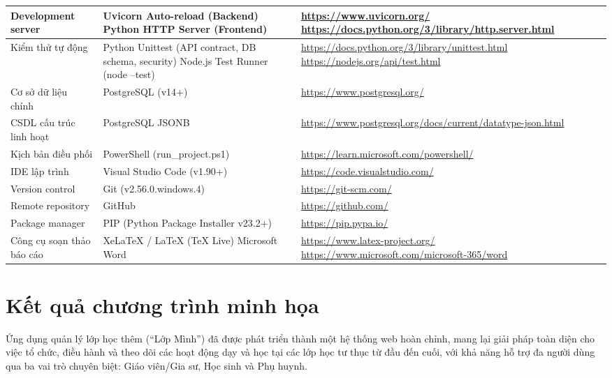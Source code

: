 \documentclass[12pt,a4paper]{report}
\begin{document}
\begin{longtable}{|>{\raggedright\arraybackslash}p{3.8cm}|>{\raggedright\arraybackslash}p{5.4cm}|>{\raggedright\arraybackslash}p{6.4cm}|}
    Development server & Uvicorn Auto-reload (Backend) \newline Python HTTP Server (Frontend) & \url{https://www.uvicorn.org/} \newline \url{https://docs.python.org/3/library/http.server.html} \\ \hline
    Kiểm thử tự động & Python Unittest (API contract, DB schema, security) \newline Node.js Test Runner (node --test) & \url{https://docs.python.org/3/library/unittest.html} \newline \url{https://nodejs.org/api/test.html} \\ \hline
    Cơ sở dữ liệu chính & PostgreSQL (v14+) & \url{https://www.postgresql.org/} \\ \hline
    CSDL cấu trúc linh hoạt & PostgreSQL JSONB & \url{https://www.postgresql.org/docs/current/datatype-json.html} \\ \hline
    Kịch bản điều phối & PowerShell (run\_project.ps1) & \url{https://learn.microsoft.com/powershell/} \\ \hline
    IDE lập trình & Visual Studio Code (v1.90+) & \url{https://code.visualstudio.com/} \\ \hline
    Version control & Git (v2.56.0.windows.4) & \url{https://git-scm.com/} \\ \hline
    Remote repository & GitHub & \url{https://github.com/} \\ \hline
    Package manager & PIP (Python Package Installer v23.2+) & \url{https://pip.pypa.io/} \\ \hline
    Công cụ soạn thảo báo cáo & XeLaTeX / LaTeX (TeX Live) \newline Microsoft Word & \url{https://www.latex-project.org/} \newline \url{https://www.microsoft.com/microsoft-365/word} \\ \hline
\end{longtable}

\section{Kết quả chương trình minh họa}

Ứng dụng quản lý lớp học thêm (``Lớp Mình'') đã được phát triển thành một hệ thống web hoàn chỉnh, mang lại giải pháp toàn diện cho việc tổ chức, điều hành và theo dõi các hoạt động dạy và học tại các lớp học tư thục từ đầu đến cuối, với khả năng hỗ trợ đa người dùng qua ba vai trò chuyên biệt: Giáo viên/Gia sư, Học sinh và Phụ huynh.
\end{document}

